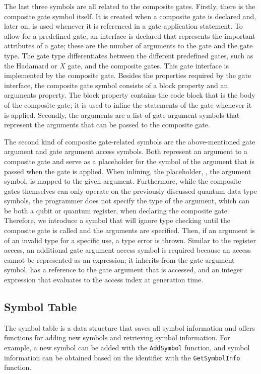 The last three symbols are all related to the composite gates. Firstly, there is the composite gate symbol itself. It is created when a composite gate is declared and, later on, is used whenever it is referenced in a gate application statement. To allow for a predefined gate, an interface is declared that represents the important attributes of a gate; these are the number of arguments to the gate and the gate type. The gate type differentiates between the different predefined gates, such as the Hadamard or $X$ gate, and the composite gates. This gate interface is implemented by the composite gate. Besides the properties required by the gate interface, the composite gate symbol consists of a block property and an arguments property. The block property contains the code block that is the body of the composite gate; it is used to inline the statements of the gate whenever it is applied. Secondly, the arguments are a list of gate argument symbols that represent the arguments that can be passed to the composite gate.

The second kind of composite gate-related symbols are the above-mentioned gate argument and gate argument access symbols. Both represent an argument to a composite gate and serve as a placeholder for the symbol of the argument that is passed when the gate is applied. When inlining, the placeholder, \ie, the argument symbol, is mapped to the given argument. Furthermore, while the composite gates themselves can only operate on the previously discussed quantum data type symbols, the programmer does not specify the type of the argument, which can be both a qubit or quantum register, when declaring the composite gate. Therefore, we introduce a symbol that will ignore type checking until the composite gate is called and the arguments are specified. Then, if an argument is of an invalid type for a specific use, a type error is thrown. Similar to the register access, an additional gate argument access symbol is required because an access cannot be represented as an expression; it inherits from the gate argument symbol, has a reference to the gate argument that is accessed, and an integer expression that evaluates to the access index at generation time.

\subsection{Symbol Table}
\label{sec:implementation_symbolTable}
The symbol table is a data structure that saves all symbol information and offers functions for adding new symbols and retrieving symbol information. For example, a new symbol can be added with the \texttt{AddSymbol} function, and symbol information can be obtained based on the identifier with the \texttt{GetSymbolInfo} function.

